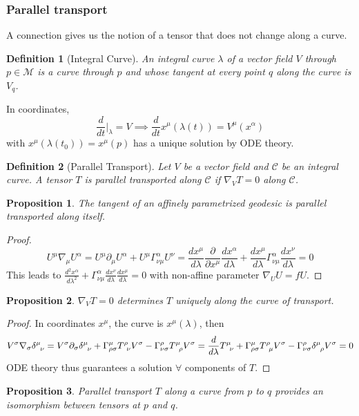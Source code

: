 \documentclass[a4paper]{article}
\theoremstyle{new}
\newtheorem{defi}{Definition}[section]
\newtheorem{prop}{Proposition}[section]
\begin{document}
\subsubsection{Parallel transport}
A connection gives us the notion of a tensor that does not change along a curve.
\begin{defi}[Integral Curve]
An integral curve $\lambda$ of a vector field $V$ through $p\in\mathcal{M}$ is a curve through $p$ and whose tangent at every point $q$ along the curve is $V_q$. 
\end{defi}
In coordinates, 
$$\frac{d}{dt}\bigg|_\lambda=V\implies\frac{d}{dt}x^\mu(\lambda(t))=V^\mu(x^\alpha)$$
with $x^\mu(\lambda(t_0))=x^\mu(p)$ has a unique solution by ODE theory.
\begin{defi}[Parallel Transport]
Let $V$ be a vector field and $\mathcal{C}$ be an integral curve. A tensor $T$ is parallel transported along $\mathcal{C}$ if $\nabla_VT=0$ along $\mathcal{C}$.
\end{defi}
\begin{prop}
The tangent of an affinely parametrized geodesic is parallel transported along itself.
\end{prop}
\begin{proof}
$$U^\mu\nabla_\mu U^\alpha=U^\mu\partial_\mu U^\alpha+U^\mu\Gamma_{\nu\mu}^\alpha U^\nu=\frac{dx^\mu}{d\lambda}\frac{\partial}{\partial x^\mu}\frac{dx^\alpha}{d\lambda}+\frac{dx^\mu}{d\lambda}\Gamma_{\nu\mu}^\alpha\frac{dx^\nu}{d\lambda}=0$$
This leads to $\frac{d^2x^\alpha}{d\lambda^2}+\Gamma_{\nu\mu}^\alpha\frac{dx^\nu}{d\lambda}\frac{dx^\mu}{d\lambda}=0$ with non-affine parameter $\nabla_UU=fU$.
\end{proof}
\begin{prop}
$\nabla_VT=0$ determines $T$ uniquely along the curve of transport.
\end{prop}
\begin{proof}
In coordinates $x^\mu$, the curve is $x^\mu(\lambda)$, then
$$V^\sigma\nabla_\sigma \tensor*{\delta}{*_{}^{\mu}_{\nu}}=V^\sigma\partial_\sigma \tensor*{\delta}{*_{}^{\mu}_{\nu}}+\Gamma_{\rho\sigma}^\mu \tensor*{T}{*_{}^{\rho}_{\nu}}V^\sigma-\Gamma_{\nu\sigma}^\rho \tensor*{T}{*_{}^{\mu}_{\rho}}V^\sigma=\frac{d}{d\lambda}\tensor*{T}{*_{}^{\mu}_{\nu}}+\Gamma_{\rho\sigma}^\mu\tensor*{T}{*_{}^{\rho}_{\mu}}V^\sigma-\Gamma_{\nu\sigma}^\rho \tensor*{\delta}{*_{}^{\mu}_{\rho}}V^\sigma=0$$
ODE theory thus guarantees a solution $\forall$ components of $T$.
\end{proof}
\begin{prop}
Parallel transport $T$ along a curve from $p$ to $q$ provides an isomorphism between tensors at $p$ and $q$.
\end{prop}
\end{document}

